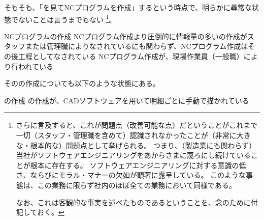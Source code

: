 \clearpage
そもそも、「\nameDrawing を見てNCプログラムを作成」するという時点で、明らかに尋常な状態でないことは言うまでもない
\footnote{さらに言及すると、これが問題点（改善可能な点）だということがこれまで一切（スタッフ・管理職を含めて）認識されなかったことが（非常に大きな・根本的な）問題点として挙げられる。
つまり、（製造業にも関わらず）当社がソフトウェアエンジニアリングをあからさまに蔑ろにし続けていることが根本に存在する。
ソフトウェアエンジニアリングに対する意識の低さ、ならびにモラル・マナーの欠如が顕著に露呈している。
このような事態は、この業務に限らず社内のほぼ全ての業務において同様である。

なお、これは客観的な事実を述べたものであるということを、念のために付記しておく。}。
\begin{Issues}{NCプログラムの作成}
NCプログラム作成より圧倒的に情報量の多い\nameDrawing の作成がスタッフまたは管理職によりなされているにも関わらず、NCプログラム作成はその後工程としてなされている
\tcbline*
NCプログラム作成が、現場作業員（一般職）により行われている
\end{Issues}
その\nameDrawing の作成についても以下のような状態にある。
\begin{Issues}{\nameDrawing の作成}
\nameDrawing の作成が、CADソフトウェアを用いて明細ごとに手動で描かれている
\end{Issues}
